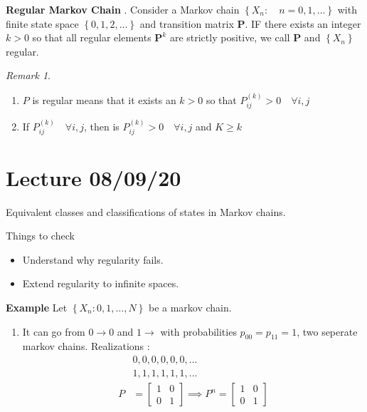 \documentclass{article}
\theoremstyle{remark}
\newtheorem*{remark}{Remark}
\newcommand{\newpara}
  {
  \vskip 0.4cm
  }
\begin{document}
\begin{definition}
  \textbf{Regular Markov Chain} . Consider a Markov chain $\left\{ X_{n}: \quad  n = 0,1,\ldots  \right\}$ with finite state space $ \left\{ 0,1,2, \ldots \right\}$ and transition matrix $\mathbf{P}$. IF there exists an integer $k >0$ so that all regular elements $\mathbf{P}^{k}$ are strictly positive, we call $\mathbf{P}$ and $\left\{ X_{n} \right\}$ regular. 
\end{definition}

\begin{remark}
   \begin{enumerate}
     \item $P$ is regular means that it exists an $k > 0$ so that $P^{(k)} _{ ij} > 0 \quad  \forall i,j $
     \item  If $P^{(k)} _{ij} \quad  \forall i,j $, then is $P^{(k)} _{ij} > 0 \quad  \forall i,j $ and $K \ge k$ 
   \end{enumerate}
\end{remark}


\newpage
\section{Lecture 08/09/20}%
\label{sec:lecture_08_09_20}

Equivalent classes and classifications of states in Markov chains.


\newpara
Things to check
\begin{itemize}
  \item Understand why regularity fails.
  \item Extend regularity to infinite spaces.
\end{itemize}

\textbf{Example} 
Let $\left\{ X_{n}: 0,1,\ldots,N \right\}$ be a markov chain.

\begin{enumerate}[label=(\alph*)]
  \item It can go from $0\to 0$ and $1\to $ with probabilities $p_{00} = p_{11} = 1$, two seperate markov chains. Realizations : \[
  \begin{split}
      &  0, 0,0,0,0,0,    \ldots\\
      &  1,1,1,1,1,1,  \ldots  \\
    P &= \begin{bmatrix} 
    1  &  0 \\
    0  &  1
    \end{bmatrix}  \implies  P^{n} = \begin{bmatrix} 
    1  &  0 \\
    0  &  1
    \end{bmatrix} 
     \\
  \end{split} 
  \] 
\end{enumerate}
\end{document}
